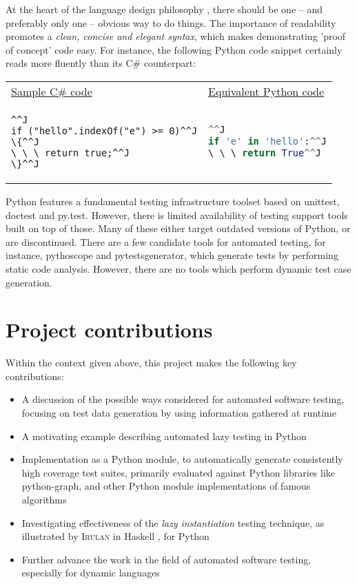 At the heart of the language design philosophy \cite{Pep20ZenPython}, there should be one -- and preferably only one -- obvious way to do things. The importance of readability promotes a \emph{clean, concise and elegant syntax}, which makes demonstrating 'proof of concept' code easy.
\clearpage
For instance, the following Python code snippet certainly reads more fluently than its C\# counterpart:

\begin{tabularx}{\textwidth}{X X}
\underline{Sample C\# code} & \underline{Equivalent Python code} \\
\begin{lstlisting}[language=CSharp]^^J
if ("hello".indexOf("e") >= 0)^^J
\{^^J
\ \ \ return true;^^J
\}^^J
\end{lstlisting}
&
\begin{lstlisting}[language=python]^^J
if 'e' in 'hello':^^J
\ \ \ return True^^J
\end{lstlisting}
\end{tabularx}
Python features a fundamental testing infrastructure toolset based on \textsf{unittest}, \textsf{doctest} and \textsf{py.test}. However, there is limited availability of testing support tools built on top of those. Many of these either target outdated versions of Python, or are discontinued. There are a few candidate tools for automated testing, for instance, \textsf{pythoscope} and \textsf{pytestsgenerator}, which generate tests by performing static code analysis. However, there are no tools which perform dynamic test case generation.
\section{Project contributions}
Within the context given above, this project makes the following key contributions:

\begin{itemize}
	\item A discussion of the possible ways considered for automated software testing, focusing on test data generation by using information gathered at runtime
	\item A motivating example describing automated lazy testing in Python
	\item Implementation as a Python module, to automatically generate consistently high coverage test suites, primarily evaluated against Python libraries like python-graph, and other Python module implementations of famous algorithms
	\item Investigating effectiveness of the \emph{lazy instantiation} testing technique, as illustrated by \textsc{Irulan} in Haskell \cite{Allwood2011}, for Python
	\item Further advance the work in the field of automated software testing, especially for dynamic languages
\end{itemize}

